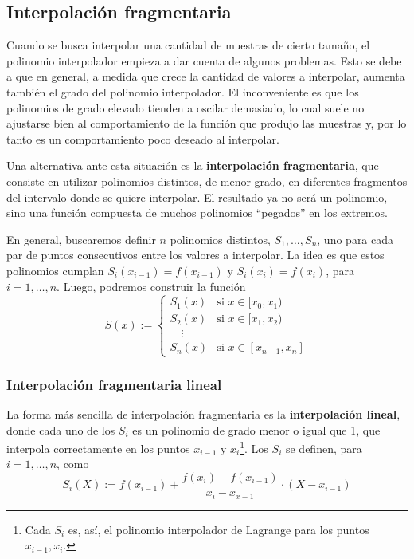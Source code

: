 \subsection{Interpolación fragmentaria}
Cuando se busca interpolar una cantidad de muestras de cierto tamaño, el
polinomio interpolador empieza a dar cuenta de algunos problemas. Esto se debe
a que en general, a medida que crece la cantidad de valores a interpolar,
aumenta también el grado del polinomio interpolador. El inconveniente es que
los polinomios de grado elevado tienden a oscilar demasiado, lo cual suele no
ajustarse bien al comportamiento de la función que produjo las muestras y, por
lo tanto es un comportamiento poco deseado al interpolar.

Una alternativa ante esta situación es la \textbf{interpolación fragmentaria},
que consiste en utilizar polinomios distintos, de menor grado, en diferentes
fragmentos del intervalo donde se quiere interpolar. El resultado ya no será
un polinomio, sino una función compuesta de muchos polinomios ``pegados'' en
los extremos.

En general, buscaremos definir $n$ polinomios distintos, $S_1, \dots, S_n$,
uno para cada par de puntos consecutivos entre los valores a interpolar. La
idea es que estos polinomios cumplan $S_i(x_{i-1}) = f(x_{i-1})$ y $S_i(x_i)
= f(x_i)$, para $i = 1, \dots, n$. Luego, podremos construir la función
\[ S(x) := \begin{cases}
    S_1(x) & \text{si } x \in [x_0,x_1) \\
    S_2(x) & \text{si } x \in [x_1,x_2) \\
    \quad \vdots \\
    S_n(x) & \text{si } x \in [x_{n-1}, x_n]
\end{cases} \]

\subsubsection{Interpolación fragmentaria lineal}

La forma más sencilla de interpolación fragmentaria es la
\textbf{interpolación lineal}, donde cada uno de los $S_i$ es un polinomio de
grado menor o igual que 1, que interpola correctamente en los puntos $x_{i-1}$
y $x_i$\footnote{Cada $S_i$ es, así, el polinomio interpolador de Lagrange
para los puntos $x_{i-1}, x_i$.}. Los $S_i$ se definen, para $i = 1, \dots,
n$, como
\[ S_i(X) := f(x_{i-1})
    + \frac{f(x_i) - f(x_{i-1})}{x_i-x_{x-1}} \cdot (X - x_{i-1}) \]

